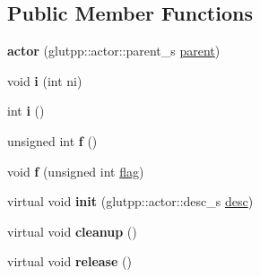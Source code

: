 \subsection*{\-Public \-Member \-Functions}
\begin{DoxyCompactItemize}
\item 
\hypertarget{classglutpp_1_1actor_1_1actor_a0ef9991b57680038bd67f2c86e9fe09e}{{\bfseries actor} (glutpp\-::actor\-::parent\-\_\-s \hyperlink{classglutpp_1_1actor_1_1parent}{parent})}\label{classglutpp_1_1actor_1_1actor_a0ef9991b57680038bd67f2c86e9fe09e}

\item 
\hypertarget{classglutpp_1_1actor_1_1actor_acc3a268bcb48b3e1899a5b68fa60ad4d}{void {\bfseries i} (int ni)}\label{classglutpp_1_1actor_1_1actor_acc3a268bcb48b3e1899a5b68fa60ad4d}

\item 
\hypertarget{classglutpp_1_1actor_1_1actor_ac45c88f241bf87e639cf5d0986de8a3b}{int {\bfseries i} ()}\label{classglutpp_1_1actor_1_1actor_ac45c88f241bf87e639cf5d0986de8a3b}

\item 
\hypertarget{classglutpp_1_1actor_1_1actor_a5d800cbcdb4006e59e4923548a73d98f}{unsigned int {\bfseries f} ()}\label{classglutpp_1_1actor_1_1actor_a5d800cbcdb4006e59e4923548a73d98f}

\item 
\hypertarget{classglutpp_1_1actor_1_1actor_a979cbbb3fd55f5bfdc618fbaa63784a6}{void {\bfseries f} (unsigned int \hyperlink{structglutpp_1_1actor_1_1actor_1_1flag}{flag})}\label{classglutpp_1_1actor_1_1actor_a979cbbb3fd55f5bfdc618fbaa63784a6}

\item 
\hypertarget{classglutpp_1_1actor_1_1actor_a384324368dcbe229b6d9b274427f3d12}{virtual void {\bfseries init} (glutpp\-::actor\-::desc\-\_\-s \hyperlink{classglutpp_1_1actor_1_1desc}{desc})}\label{classglutpp_1_1actor_1_1actor_a384324368dcbe229b6d9b274427f3d12}

\item 
\hypertarget{classglutpp_1_1actor_1_1actor_a81deff185f60ffab9373fb68257221fb}{virtual void {\bfseries cleanup} ()}\label{classglutpp_1_1actor_1_1actor_a81deff185f60ffab9373fb68257221fb}

\item 
\hypertarget{classglutpp_1_1actor_1_1actor_a3e31d7fa4231564b9b6c98d93c6a8d17}{virtual void {\bfseries release} ()}\label{classglutpp_1_1actor_1_1actor_a3e31d7fa4231564b9b6c98d93c6a8d17}


\end{DoxyCompactItemize}

